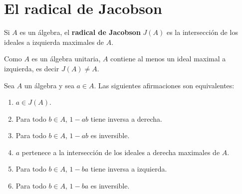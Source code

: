 \chapter{El radical de Jacobson}


\begin{definition}
Si $A$ es un álgebra, el \textbf{radical de Jacobson} $J(A)$ es la intersección de 
los ideales a izquierda maximales de $A$. 
\end{definition}

Como $A$ es un álgebra unitaria, 
$A$ contiene al menos un ideal maximal a izquierda, es decir $J(A)\ne A$.

\begin{proposition}
	\label{pro:radical}
	Sea $A$ un álgebra y sea $a\in A$. Las siguientes afirmaciones son equivalentes:
	\begin{enumerate}
		\item $a\in J(A)$.
		\item Para todo $b\in A$, $1-ab$ tiene inversa a derecha.
		\item Para todo $b\in A$, $1-ab$ es inversible.
		\item $a$ pertenece a la intersección de los ideales a derecha maximales de $A$.
		\item Para todo $b\in A$, $1-ba$ tiene inversa a izquierda.
		\item Para todo $b\in A$, $1-ba$ es inversible.
	\end{enumerate}
\end{proposition}

